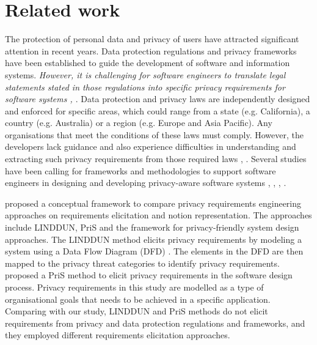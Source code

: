 \section{Related work} \label{sec:related-work}

The protection of personal data and privacy of users have attracted significant attention in recent years. Data protection regulations and privacy frameworks have been established to guide the development of software and information systems. \emph{However, it is challenging for software engineers to translate legal statements stated in those regulations into specific privacy requirements for software systems \cite{Ayala-Rivera2018}, \cite{Aljeraisy2020}}. Data protection and privacy laws are independently designed and enforced for specific areas, which could range from a state (e.g. California), a country (e.g. Australia) or a region (e.g. Europe and Asia Pacific). Any organisations that meet the conditions of these laws must comply. However, the developers lack guidance and also experience difficulties in understanding and extracting such privacy requirements from those required laws \cite{Ayala-Rivera2018}, \cite{Aljeraisy2020}. Several studies have been calling for frameworks and methodologies to support software engineers in designing and developing privacy-aware software systems \cite{Gurses2011}, \cite{Senarath2018b}, \cite{Sheth2014}, \cite{Birnhack2014}. 

\citeauthor{Beckers2012} \cite{Beckers2012} proposed a conceptual framework to compare privacy requirements engineering approaches on requirements elicitation and notion representation. The approaches include LINDDUN, PriS and the framework for privacy-friendly system design approaches. The LINDDUN method elicits privacy requirements by modeling a system using a Data Flow Diagram (DFD) \cite{Deng2011}. The elements in the DFD are then mapped to the privacy threat categories to identify privacy requirements. \citeauthor{Kalloniatis2008} \cite{Kalloniatis2008} proposed a PriS method to elicit privacy requirements in the software design process. Privacy requirements in this study are modelled as a type of organisational goals that needs to be achieved in a specific application. Comparing with our study, LINDDUN and PriS methods do not elicit requirements from privacy and data protection regulations and frameworks, and they employed different requirements elicitation approaches.

